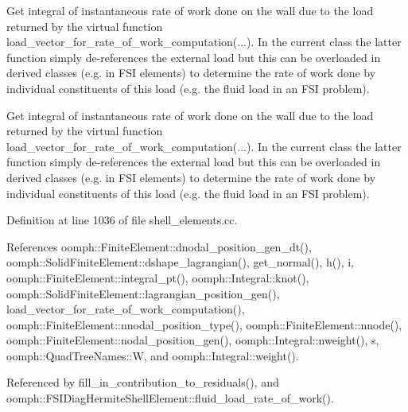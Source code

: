 Get integral of instantaneous rate of work done on the wall due to the load returned by the virtual function load\+\_\+vector\+\_\+for\+\_\+rate\+\_\+of\+\_\+work\+\_\+computation(...). In the current class the latter function simply de-\/references the external load but this can be overloaded in derived classes (e.\+g. in F\+SI elements) to determine the rate of work done by individual constituents of this load (e.\+g. the fluid load in an F\+SI problem). 

Get integral of instantaneous rate of work done on the wall due to the load returned by the virtual function load\+\_\+vector\+\_\+for\+\_\+rate\+\_\+of\+\_\+work\+\_\+computation(...). In the current class the latter function simply de-\/references the external load but this can be overloaded in derived classes (e.\+g. in F\+SI elements) to determine the rate of work done by individual constituents of this load (e.\+g. the fluid load in an F\+SI problem). 

Definition at line 1036 of file shell\+\_\+elements.\+cc.



References oomph\+::\+Finite\+Element\+::dnodal\+\_\+position\+\_\+gen\+\_\+dt(), oomph\+::\+Solid\+Finite\+Element\+::dshape\+\_\+lagrangian(), get\+\_\+normal(), h(), i, oomph\+::\+Finite\+Element\+::integral\+\_\+pt(), oomph\+::\+Integral\+::knot(), oomph\+::\+Solid\+Finite\+Element\+::lagrangian\+\_\+position\+\_\+gen(), load\+\_\+vector\+\_\+for\+\_\+rate\+\_\+of\+\_\+work\+\_\+computation(), oomph\+::\+Finite\+Element\+::nnodal\+\_\+position\+\_\+type(), oomph\+::\+Finite\+Element\+::nnode(), oomph\+::\+Finite\+Element\+::nodal\+\_\+position\+\_\+gen(), oomph\+::\+Integral\+::nweight(), s, oomph\+::\+Quad\+Tree\+Names\+::W, and oomph\+::\+Integral\+::weight().



Referenced by fill\+\_\+in\+\_\+contribution\+\_\+to\+\_\+residuals(), and oomph\+::\+F\+S\+I\+Diag\+Hermite\+Shell\+Element\+::fluid\+\_\+load\+\_\+rate\+\_\+of\+\_\+work().

\mbox{\label{classoomph_1_1KirchhoffLoveShellEquations_ad404001c9a8c9587ece41bc4ff8c1ce1}} 
